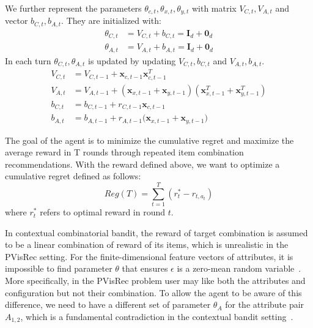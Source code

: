 We further represent the parameters $\theta_{c,t},\theta_{x,t},\theta_{y,t}$ with matrix $V_{C,t},V_{A,t}$ and vector $b_{C,t},b_{A,t}$. They are initialized with:
\begin{align}
    \theta_{C,t}&=V_{C,t}+b_{C,t}=\mathbf I_d+\mathbf 0_d\\ 
    \theta_{A,t}&=V_{A,t}+b_{A,t}=\mathbf I_d+\mathbf 0_d \label{eqn:theta_def}  
\end{align}
In each turn $\theta_{C,t},\theta_{A,t}$ is updated by updating $V_{C,t},b_{C,t}$ and $V_{A,t},b_{A,t}$.
\begin{align}
    V_{C,t}&=V_{C,t-1}+\mathbf x_{c,t-1}\mathbf x_{c,t-1}^T\\
    V_{A,t}&=V_{A,t-1}+(\mathbf x_{x,t-1}+\mathbf x_{y,t-1})(\mathbf x_{x,t-1}^T+\mathbf x_{y,t-1}^T)\\
    b_{C,t}&=b_{C,t-1}+ r_{C,t-1}\mathbf x_{c,t-1}\\
    b_{A,t}&=b_{A,t-1}+ r_{A,t-1}\mathbf (\mathbf x_{x,t-1}+\mathbf x_{y,t-1})
   \label{eqn:theta_update}
\end{align}


The goal of the agent is to minimize the cumulative regret and maximize the average reward in T rounds through repeated item combination recommendations. With the reward defined above, we want to optimize a cumulative regret defined as follows:
\begin{equation}
    Reg(T)=\sum_{t=1}^T(r_{t}^* - r_{t,a_t})
    \label{oldReg}
\end{equation}
where $r_t^*$ refers to optimal reward in round $t$.

In contextual combinatorial bandit, the reward of target combination is assumed to be a linear combination of reward of its items, which is unrealistic in the PVisRec setting. For the finite-dimensional feature vectors of attributes, it is impossible to find parameter $\theta$ that ensures $\epsilon$ is a zero-mean random variable~\cite{peng2019practical}.
More specifically, in the PVisRec problem user may like both the attributes and configuration but not their combination. To allow the agent to be aware of this difference, we need to have a different set of parameter $\theta_A$ for the attribute pair $A_{1,2}$, which is a fundamental contradiction in the contextual bandit setting~\cite{qin_contextual_2014}.

 
